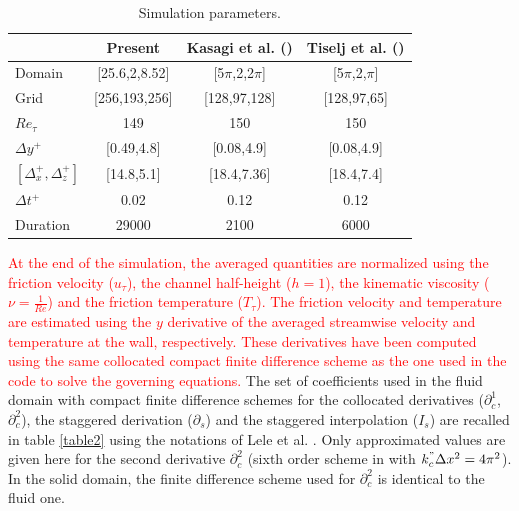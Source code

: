\documentclass[review]{elsarticle}
\begin{document}
\begin{table}[htbp]
\begin{center}
\begin{tabular}[htbp]{|l|c|c|c|}
\hline
          & Present & Kasagi et al. (\cite{kasagi1992direct}) & Tiselj et al. (\cite{Tiselj2001dns}) \\ \hline
Domain                     & [25.6,2,8.52] & [5$\pi$,2,2$\pi$] & [5$\pi$,2,$\pi$] \\ \hline
Grid                       & [256,193,256] & [128,97,128] & [128,97,65] \\ \hline
$Re_\tau$                  & 149 & 150 & 150 \\ \hline
$\Delta y^+$               & [0.49,4.8] & [0.08,4.9] & [0.08,4.9] \\ \hline
$[\Delta_x^+, \Delta_z^+]$ & [14.8,5.1] & [18.4,7.36] & [18.4,7.4] \\ \hline
$\Delta t^+$               & 0.02 & 0.12 & 0.12 \\ \hline
Duration                   & 29000 & 2100 & 6000 \\ \hline
\end{tabular}
\end{center}
\caption{Simulation parameters.}
\label{table1}
\end{table}

\textcolor{red}{At the end of the simulation, the averaged quantities are normalized using the friction velocity ($u_\tau$), the channel half-height ($h=1$), the kinematic viscosity ($\nu = \tfrac{1}{Re}$) and the friction temperature ($T_\tau$).
The friction velocity and temperature are estimated using the $y$ derivative of the averaged streamwise velocity and temperature at the wall, respectively.
These derivatives have been computed using the same collocated compact finite difference scheme as the one used in the code to solve the governing equations.}
The set of coefficients used in the fluid domain with compact finite difference schemes for the collocated derivatives ($\partial_c^1$,$\partial_c^2$), the staggered derivation ($\partial_s$) and the staggered interpolation ($I_s$) are recalled in table \ref{table2} using the notations of Lele et al. \cite{lele1992compact}.
Only approximated values are given here for the second derivative $\partial_c^2$ (sixth order scheme in \cite{lamballais2011straightforward} with $k_c^{"}\Delta x^2 = 4 \pi^2$).
In the solid domain, the finite difference scheme used for $\partial_c^2$ is identical to the fluid one.
\end{document}
